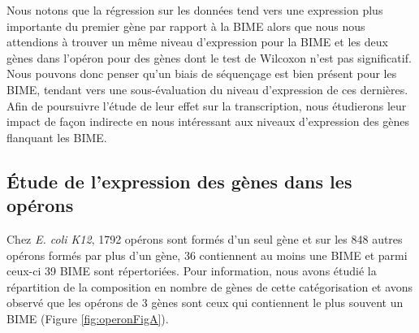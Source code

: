 \documentclass[12pt,a4paper]{report}
\begin{document}
\begin{onehalfspace}
Nous notons que la régression sur les données tend vers une expression plus importante du premier gène par rapport à la BIME alors que nous nous attendions à trouver un même niveau d'expression pour la BIME et les deux gènes dans l'opéron pour des gènes dont le test de Wilcoxon n'est pas significatif. Nous pouvons donc penser qu'un biais de séquençage est bien présent pour les BIME, tendant vers une sous-évaluation du niveau d'expression de ces dernières. Afin de poursuivre l'étude de leur effet sur la transcription, nous étudierons leur impact de façon indirecte en nous intéressant aux niveaux d'expression des gènes flanquant les BIME.

\subsection*{Étude de l'expression des gènes dans les opérons}
Chez \textit{E. coli K12}, 1792 opérons sont formés d'un seul gène et sur les 848 autres opérons formés par plus d'un gène, 36 contiennent au moins une BIME et parmi ceux-ci 39 BIME sont répertoriées. Pour information, nous avons étudié la répartition de la composition en nombre de gènes de cette catégorisation et avons observé que les opérons de 3 gènes sont ceux qui contiennent le plus souvent un BIME (Figure \autoref{fig:operonFigA}).


\end{onehalfspace}
\end{document}
